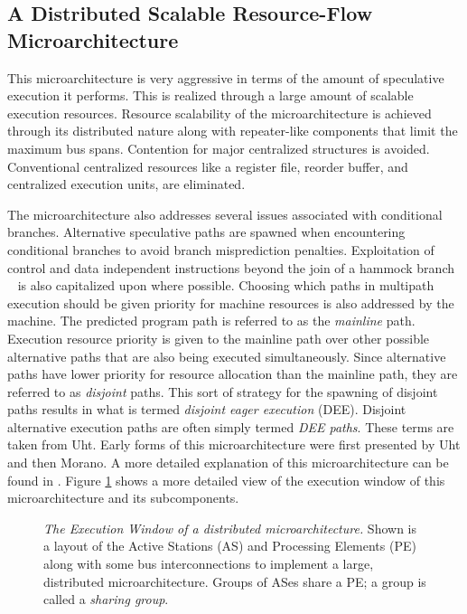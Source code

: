 \documentclass{book}
\begin{document}
\subsection{A Distributed Scalable Resource-Flow Microarchitecture}
%
This microarchitecture is very aggressive in terms of
the amount of speculative execution it performs.
This is realized through a large amount of scalable execution
resources.
Resource scalability
of the microarchitecture is achieved through its distributed nature
along with repeater-like components that limit the maximum bus
spans.
Contention for major centralized structures is avoided.
Conventional centralized resources like a register file,
reorder buffer, and centralized execution units, are eliminated.

The microarchitecture also 
addresses several issues associated with conditional branches.
Alternative speculative paths are spawned when encountering conditional
branches to avoid branch misprediction penalties.
Exploitation of control
and data independent instructions beyond the join of a 
hammock branch ~\cite{Fer87,Uht86}
is also capitalized upon where possible.
Choosing which paths in multipath execution should
be given priority for machine resources is also addressed
by the machine.
The predicted program path is referred to as the \textit{mainline} path.  
Execution resource priority is given to the mainline path over
other possible alternative paths that are also being executed 
simultaneously.
Since alternative paths have lower priority for resource allocation
than the mainline path, they are referred
to as \textit{disjoint} paths.  
This sort of strategy for the spawning of disjoint 
paths results in what is termed \textit{disjoint eager execution} (DEE).
Disjoint alternative execution paths are often simply termed \textit{DEE paths}.
These terms are taken from Uht. \cite{Uht95}
Early forms of this microarchitecture were first 
presented by
Uht \cite{uht02realizing} and then Morano. \cite{morano02high}
A more detailed explanation of this microarchitecture can be
found in \cite{uht03levo}.
%
Figure \ref{fig:window} shows a more detailed view
of the execution window of this microarchitecture and its subcomponents.
%
\begin{figure}
\centerline{}
\caption[The Execution Window of a distributed microarchitecture]
{{\em The Execution Window of a distributed microarchitecture.}
Shown is a layout of the Active Stations (AS) and Processing Elements (PE)
along with some bus interconnections to implement a large,
distributed microarchitecture. Groups of ASes share a PE; a group is called
a {\em sharing group}.}
\label{fig:window}
\end{figure}
%
\end{document}
